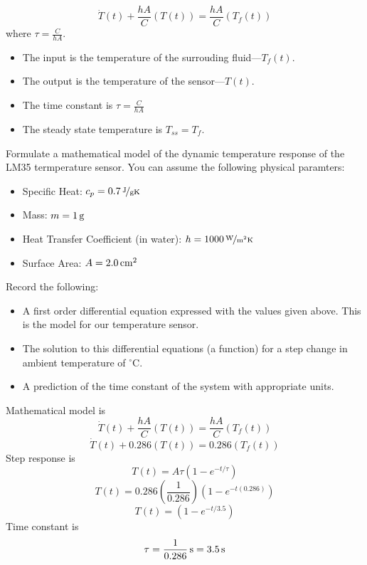 \ifsolutions
\begin{soln}
\[ 
\dot{T}(t)+\frac{hA}{C}(T(t)) = \frac{hA}{C} (T_f(t)) 
\]
where $\tau = \frac{C}{hA}$.
\begin{itemize}
\item The input is the temperature of the surrouding fluid---$T_f(t)$.
\item The output is the temperature of the sensor---$T(t)$.
\item The time constant is $\tau = \frac{C}{hA}$
\item The steady state temperature is $T_{ss}=T_f$.
\end{itemize}
\end{soln}
\fi

\begin{ex}
Formulate a mathematical model of the dynamic temperature response of the LM35 termperature sensor.  You can assume the following physical paramters:
\begin{itemize}
\item Specific Heat: $c_p=\unitfrac[0.7]{J}{gK}$
\item Mass: $m=\unit[1]{g}$
\item Heat Transfer Coefficient (in water): $h=\unitfrac[1000]{W}{m^2K}$
\item Surface Area: $A=\unit[2.0]{cm^2}$
\end{itemize}
Record the following:
\begin{itemize}
\item A first order differential equation expressed with the values given above.  This is the model for our temperature sensor.
\item The solution to this differential equations (a function) for a step change in ambient temperature of \unit[100]{$^{\circ}$C}.
\item A prediction of the time constant of the system with appropriate units.
\end{itemize}
\end{ex}

\ifsolutions
\begin{soln}
Mathematical model is 
\[ 
\dot{T}(t)+\frac{hA}{C}(T(t)) = \frac{hA}{C} (T_f(t)) 
\]
\[ 
\dot{T}(t)+0.286(T(t)) = 0.286 (T_f(t)) 
\]
Step response is 
\[ T(t) = A\tau\left(1-e^{-t/\tau}\right)
\]
\[ T(t) = 0.286\left(\frac{1}{0.286}\right)\left(1-e^{-t(0.286)}\right)
\]
\[ T(t) = \left(1-e^{-t/3.5}\right)
\]
Time constant is
\[
\tau = \unit[\frac{1}{0.286}]{s} = \unit[3.5]{s}
\]
\end{soln}
\fi

